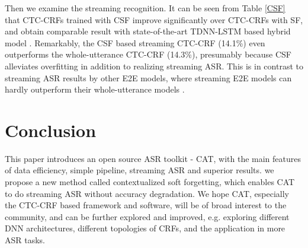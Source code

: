 \documentclass[a4paper]{article}
\begin{document}
\begin{table}[!th]
\vspace{-0.1cm}
	\centering
	\caption{Streaming recognition results of CTC-CRFs, trained with Soft Forgetting (SF) and Contextualized Soft Forgetting (CSF) over (260-h) Switchboard.}
	\vspace{-0.25cm}

	\label{CSF}
\vspace{-0.35cm}
\end{table}

Then we examine the streaming recognition.
It can be seen from Table \ref{CSF} that CTC-CRFs trained with CSF improve significantly over CTC-CRFs with SF, and obtain comparable result with state-of-the-art TDNN-LSTM based hybrid model \cite{Low-latency}. 
Remarkably, the CSF based streaming CTC-CRF (14.1\%) even outperforms the whole-utterance CTC-CRF (14.3\%), presumably because CSF alleviates overfitting in addition to realizing streaming ASR.
This is in contrast to streaming ASR results by other E2E models, where streaming E2E models can hardly outperform their whole-utterance models \cite{SAN,CAS_transformer,MERL_transformer}.

\section{Conclusion}
This paper introduces an open source ASR toolkit - CAT, with the main features of data efficiency, simple pipeline, streaming ASR and superior results.
we propose a new method called contextualized soft forgetting, which enables CAT to do streaming ASR without accuracy degradation.
We hope CAT, especially the CTC-CRF based framework and software, will be of broad interest to the community, and can be further explored and improved, e.g. 
exploring different DNN architectures, different topologies of CRFs, and the application in more ASR tasks.


\end{document}
